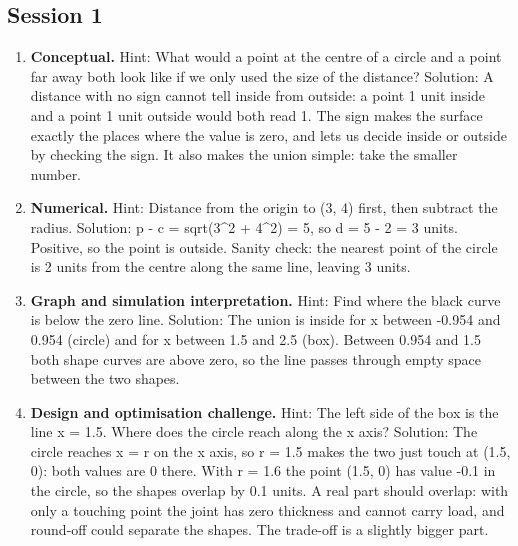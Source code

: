\documentclass[11pt,a4paper]{article}
\begin{document}
\subsection*{Session 1}
\begin{enumerate}[nosep]
\item \textbf{Conceptual.} Hint: What would a point at the centre of a circle and a point far away both look like if we only used the size of the distance? Solution: A distance with no sign cannot tell inside from outside: a point 1 unit inside and a point 1 unit outside would both read 1. The sign makes the surface exactly the places where the value is zero, and lets us decide inside or outside by checking the sign. It also makes the union simple: take the smaller number.
\item \textbf{Numerical.} Hint: Distance from the origin to (3, 4) first, then subtract the radius. Solution: \textbar{}p - c\textbar{} = sqrt(3\textasciicircum{}2 + 4\textasciicircum{}2) = 5, so d = 5 - 2 = 3 units. Positive, so the point is outside. Sanity check: the nearest point of the circle is 2 units from the centre along the same line, leaving 3 units.
\item \textbf{Graph and simulation interpretation.} Hint: Find where the black curve is below the zero line. Solution: The union is inside for x between -0.954 and 0.954 (circle) and for x between 1.5 and 2.5 (box). Between 0.954 and 1.5 both shape curves are above zero, so the line passes through empty space between the two shapes.
\item \textbf{Design and optimisation challenge.} Hint: The left side of the box is the line x = 1.5. Where does the circle reach along the x axis? Solution: The circle reaches x = r on the x axis, so r = 1.5 makes the two just touch at (1.5, 0): both values are 0 there. With r = 1.6 the point (1.5, 0) has value -0.1 in the circle, so the shapes overlap by 0.1 units. A real part should overlap: with only a touching point the joint has zero thickness and cannot carry load, and round-off could separate the shapes. The trade-off is a slightly bigger part.
\end{enumerate}
\end{document}
